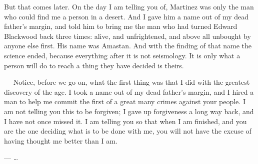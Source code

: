 But that comes later. On the day I am telling you of, Martinez was only the man who could find me a person in a desert. And I gave him a name out of my dead father's margin, and told him to bring me the man who had turned Edward Blackwood back three times: alive, and unfrightened, and above all unbought by anyone else first. His name was Amastan. And with the finding of that name the science ended, because everything after it is not seismology. It is only what a person will do to reach a thing they have decided is theirs.\par

\begin{room}

--- Notice, before we go on, what the first thing was that I did with the greatest discovery of the age. I took a name out of my dead father's margin, and I hired a man to help me commit the first of a great many crimes against your people. I am not telling you this to be forgiven; I gave up forgiveness a long way back, and I have not once missed it. I am telling you so that when I am finished, and you are the one deciding what is to be done with me, you will not have the excuse of having thought me better than I am.

--- \ldots{}

\end{room}
